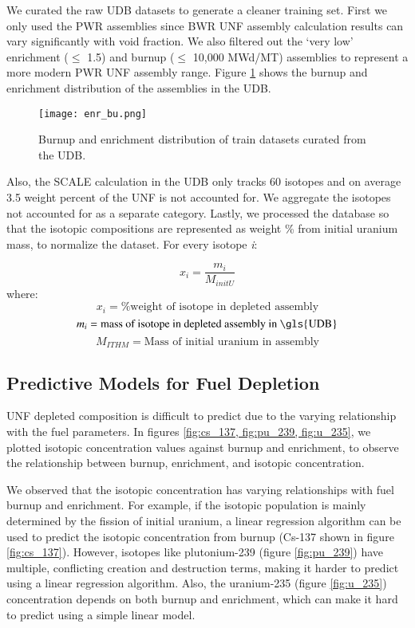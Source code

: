 We curated the raw \gls{UDB} datasets to generate
a cleaner training set. First we only used the 
\gls{PWR} assemblies since \gls{BWR} \gls{UNF} assembly
calculation results can vary significantly with void fraction.
We also filtered out the
`very low' enrichment ($\leq$ 1.5) and
burnup ($\leq$ 10,000 MWd/MT)
assemblies to represent a more modern \gls{PWR} \gls{UNF}
assembly range. Figure \ref{fig:enr_bu} shows the
burnup and enrichment distribution of the assemblies in the
\gls{UDB}.


\begin{figure}
    \centering
    \texttt{[image: enr\_bu.png]}
    \caption{Burnup and enrichment distribution of train
             datasets curated from the \gls{UDB}.}
    \label{fig:enr_bu}
\end{figure}


Also, the SCALE calculation in the \gls{UDB} only tracks 60 isotopes
and on average 3.5 weight percent of the \gls{UNF} is not accounted for. We
aggregate the isotopes not accounted for as a separate category. Lastly,
we processed the database so that the isotopic compositions are 
represented as weight \% from initial uranium mass, to normalize
the dataset. For every isotope \textit{i}:

\begin{equation}
x_i = \frac{m_i}{M_{initU}}
\end{equation}
where:
\[
x_i = \text{\% weight of isotope in depleted assembly}
\]
\[
m_i = \text{mass of isotope in depleted assembly in \gls{UDB}}
\]
\[
M_{ITHM} = \text{Mass of initial uranium in assembly}
\]


\subsection{Predictive Models for Fuel Depletion}

\gls{UNF} depleted composition is difficult to predict
due to the varying relationship with the fuel parameters.
In figures \ref{fig:cs_137, fig:pu_239, fig:u_235},
we plotted isotopic concentration values against
burnup and enrichment, to observe the relationship between
burnup, enrichment, and isotopic concentration.

We observed that the isotopic concentration has varying
relationships with fuel burnup and enrichment.
For example, if the isotopic population is mainly determined by
the fission of initial uranium, a linear regression algorithm
can be used to predict the isotopic concentration from burnup
(Cs-137 shown in figure \ref{fig:cs_137}).
However, isotopes like plutonium-239 (figure \ref{fig:pu_239}) have multiple, conflicting creation
and destruction terms, making it harder to predict using a
linear regression algorithm. Also, the uranium-235 (figure \ref{fig:u_235}) concentration
depends on both burnup and enrichment, which can make it
hard to predict using a simple linear model.

